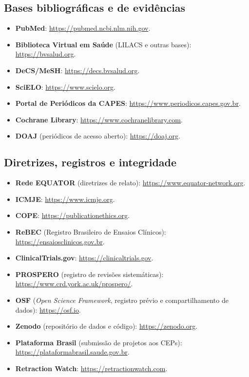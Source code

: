 \documentclass[
]{book}
\providecommand{\tightlist}{%
  \setlength{\itemsep}{0pt}\setlength{\parskip}{0pt}}
\begin{document}
\subsection{Bases bibliográficas e de evidências}\label{bases-bibliogruxe1ficas-e-de-eviduxeancias}

\begin{itemize}
\tightlist
\item
  \textbf{PubMed}: \url{https://pubmed.ncbi.nlm.nih.gov}.
\item
  \textbf{Biblioteca Virtual em Saúde} (LILACS e outras bases): \url{https://bvsalud.org}.
\item
  \textbf{DeCS/MeSH}: \url{https://decs.bvsalud.org}.
\item
  \textbf{SciELO}: \url{https://www.scielo.org}.
\item
  \textbf{Portal de Periódicos da CAPES}: \url{https://www.periodicos.capes.gov.br}.
\item
  \textbf{Cochrane Library}: \url{https://www.cochranelibrary.com}.
\item
  \textbf{DOAJ} (periódicos de acesso aberto): \url{https://doaj.org}.
\end{itemize}

\subsection{Diretrizes, registros e integridade}\label{diretrizes-registros-e-integridade}

\begin{itemize}
\tightlist
\item
  \textbf{Rede EQUATOR} (diretrizes de relato): \url{https://www.equator-network.org}.
\item
  \textbf{ICMJE}: \url{https://www.icmje.org}.
\item
  \textbf{COPE}: \url{https://publicationethics.org}.
\item
  \textbf{ReBEC} (Registro Brasileiro de Ensaios Clínicos): \url{https://ensaiosclinicos.gov.br}.
\item
  \textbf{ClinicalTrials.gov}: \url{https://clinicaltrials.gov}.
\item
  \textbf{PROSPERO} (registro de revisões sistemáticas): \url{https://www.crd.york.ac.uk/prospero/}.
\item
  \textbf{OSF} (\emph{Open Science Framework}, registro prévio e compartilhamento de dados): \url{https://osf.io}.
\item
  \textbf{Zenodo} (repositório de dados e código): \url{https://zenodo.org}.
\item
  \textbf{Plataforma Brasil} (submissão de projetos aos CEPs): \url{https://plataformabrasil.saude.gov.br}.
\item
  \textbf{Retraction Watch}: \url{https://retractionwatch.com}.
\end{itemize}
\end{document}
